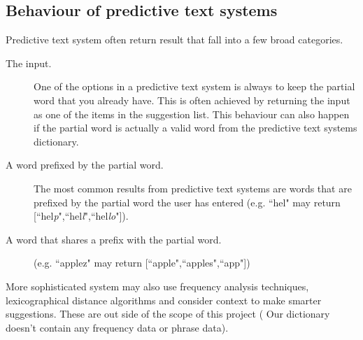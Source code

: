 \documentclass[10pt]{article} %
\begin{document}
		\subsection{Behaviour of predictive text systems}
			Predictive text system often return result that fall into a few broad categories.
			\begin{description}
				\item [The input.] One of the options in a predictive text system is always to keep the partial word that you already have. This is often achieved by returning the input as one of the items in the suggestion list. This behaviour can also happen if the partial word is actually a valid word from the predictive text systems dictionary.
				\item [A word prefixed by the partial word.] The most common results from predictive text systems are words that are prefixed by the partial word the user has entered (e.g. ``hel" may return [``hel\textit{p}",``hel\textit{l}",``hel\textit{lo}"]). 
				\item [A word that shares a prefix with the partial word.] (e.g. ``applez" may return [``apple",``apples",``app"]) 
			\end{description}
			
			More sophisticated system may also use frequency analysis techniques, lexicographical distance algorithms and consider context to make smarter suggestions. These are out side of the scope of this project ( Our dictionary doesn't contain any frequency data or phrase data).
\end{document}
